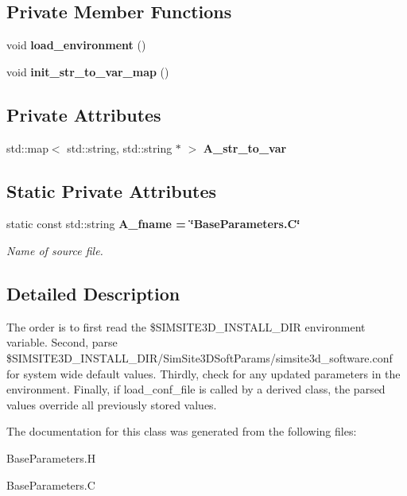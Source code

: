 \subsection*{Private Member Functions}
\begin{CompactItemize}
\item 
void \textbf{load\_\-environment} ()\label{classSimSite3D_1_1BaseParameters_d14f824ff3778e6eeadc6f280e712fa8}

\item 
void \textbf{init\_\-str\_\-to\_\-var\_\-map} ()\label{classSimSite3D_1_1BaseParameters_2b6efe90e6fc04c12a708793b134c337}

\end{CompactItemize}
\subsection*{Private Attributes}
\begin{CompactItemize}
\item 
std::map$<$ std::string, std::string $\ast$ $>$ \textbf{A\_\-str\_\-to\_\-var}\label{classSimSite3D_1_1BaseParameters_d2d6dce8fdb7bc506d95de45aa545b07}

\end{CompactItemize}
\subsection*{Static Private Attributes}
\begin{CompactItemize}
\item 
static const std::string \bf{A\_\-fname} = \char`\"{}Base\-Parameters.C\char`\"{}\label{classSimSite3D_1_1BaseParameters_41d22522d6af1b42c1ae142bba6190ca}

\begin{CompactList}\small\item\em Name of source file. \item\end{CompactList}\end{CompactItemize}


\subsection{Detailed Description}
The order is to first read the \$SIMSITE3D\_\-INSTALL\_\-DIR environment variable. Second, parse \$SIMSITE3D\_\-INSTALL\_\-DIR/SimSite3D\-Soft\-Params/simsite3d\_\-software.conf for system wide default values. Thirdly, check for any updated parameters in the environment. Finally, if load\_\-conf\_\-file is called by a derived class, the parsed values override all previously stored values. 



The documentation for this class was generated from the following files:\begin{CompactItemize}
\item 
Base\-Parameters.H\item 
Base\-Parameters.C\end{CompactItemize}
